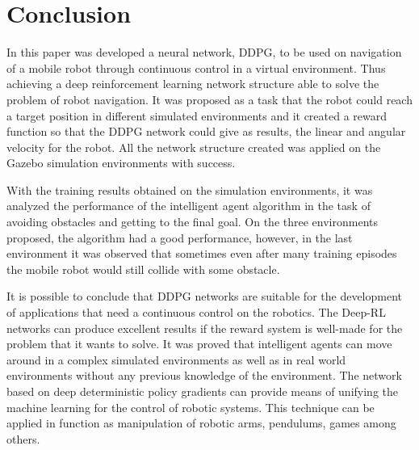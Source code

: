 \section*{Conclusion}

In this paper was developed a neural network, DDPG, to be used on navigation of a mobile robot through continuous control in a virtual environment.
Thus achieving a deep reinforcement learning network structure able to solve the problem of robot navigation.
It was proposed as a task that the robot could reach a target position in different simulated environments and it created a reward function so that the DDPG network could give as results, the linear and angular velocity for the robot. All the network structure created was applied on the Gazebo simulation environments with success.

With the training results obtained on the simulation environments, it was analyzed the performance of the intelligent agent algorithm in the task of avoiding obstacles and getting to the final goal. 
On the three environments proposed, the algorithm had a good performance, however, in the last environment it was observed that sometimes even after many training episodes the mobile robot would still collide with some obstacle.

It is possible to conclude that DDPG networks are suitable for the development of applications that need a continuous control on the robotics.
The Deep-RL networks can produce excellent results if the reward system is well-made for the problem that it wants to solve.
It was proved that intelligent agents can move around in a complex simulated environments as well as in real world environments without any previous knowledge of the environment.
The network based on deep deterministic policy gradients can provide means of unifying the machine learning for the control of robotic systems.
This technique can be applied in function as manipulation of robotic arms, pendulums, games among others.
